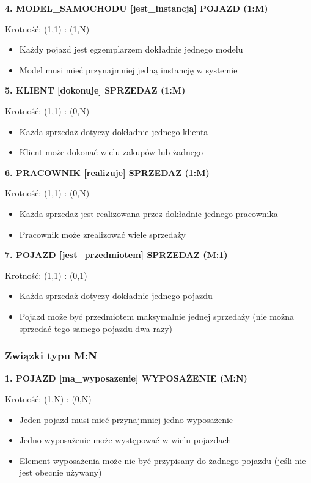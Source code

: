 \documentclass[a4paper,titleauthor]{mwart}
\begin{document}
	\textbf{4. MODEL\_SAMOCHODU [jest\_instancja] POJAZD (1:M)}
	
	Krotność: (1,1) : (1,N)
	\begin{itemize}
		\item Każdy pojazd jest egzemplarzem dokładnie jednego modelu
		\item Model musi mieć przynajmniej jedną instancję w systemie
	\end{itemize}
	
	\textbf{5. KLIENT [dokonuje] SPRZEDAZ (1:M)}
	
	Krotność: (1,1) : (0,N)
	\begin{itemize}
		\item Każda sprzedaż dotyczy dokładnie jednego klienta
		\item Klient może dokonać wielu zakupów lub żadnego
	\end{itemize}
	
	\textbf{6. PRACOWNIK [realizuje] SPRZEDAZ (1:M)}
	
	Krotność: (1,1) : (0,N)
	\begin{itemize}
		\item Każda sprzedaż jest realizowana przez dokładnie jednego pracownika
		\item Pracownik może zrealizować wiele sprzedaży
	\end{itemize}
	
	\textbf{7. POJAZD [jest\_przedmiotem] SPRZEDAZ (M:1)}
	
	Krotność: (1,1) : (0,1)
	\begin{itemize}
		\item Każda sprzedaż dotyczy dokładnie jednego pojazdu
		\item Pojazd może być przedmiotem maksymalnie jednej sprzedaży (nie można sprzedać tego samego pojazdu dwa razy)
	\end{itemize}
	
	\subsubsection{Związki typu M:N}
	
	\textbf{1. POJAZD [ma\_wyposazenie] WYPOSAŻENIE (M:N)}
	
	Krotność: (1,N) : (0,N)
	\begin{itemize}
		\item Jeden pojazd musi mieć przynajmniej jedno wyposażenie
		\item Jedno wyposażenie może występować w wielu pojazdach
		\item Element wyposażenia może nie być przypisany do żadnego pojazdu (jeśli nie jest obecnie używany)
	\end{itemize}
	
\end{document}
